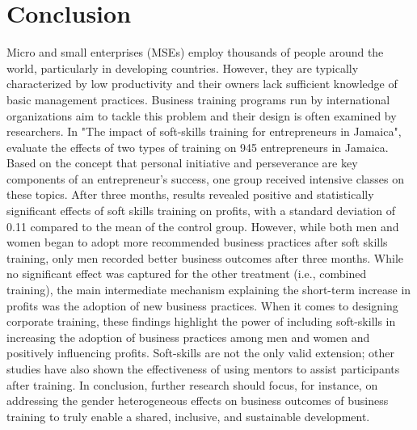 \chapter{Conclusion}
\label{sec-5-conc}

Micro and small enterprises (MSEs) employ thousands of people around the world, particularly in developing countries. However, they are typically characterized by low productivity and their owners lack sufficient knowledge of basic management practices. Business training programs run by international organizations aim to tackle this problem and their design is often examined by researchers. In "The impact of soft-skills training for entrepreneurs in Jamaica", \cite{Ubfal2022} evaluate the effects of two types of training on 945 entrepreneurs in Jamaica. Based on the concept that personal initiative and perseverance are key components of an entrepreneur's success, one group received intensive classes on these topics. After three months, results revealed positive and statistically significant effects of soft skills training on profits, with a standard deviation of 0.11 compared to the mean of the control group. However, while both men and women began to adopt more recommended business practices after soft skills training, only men recorded better business outcomes after three months. While no significant effect was captured for the other treatment (i.e., combined training), the main intermediate mechanism explaining the short-term increase in profits was the adoption of new business practices. When it comes to designing corporate training, these findings highlight the power of including soft-skills in increasing the adoption of business practices among men and women and positively influencing profits. Soft-skills are not the only valid extension; other studies have also shown the effectiveness of using mentors to assist participants after training. In conclusion, further research should focus, for instance, on addressing the gender heterogeneous effects on business outcomes of business training to truly enable a shared, inclusive, and sustainable development.